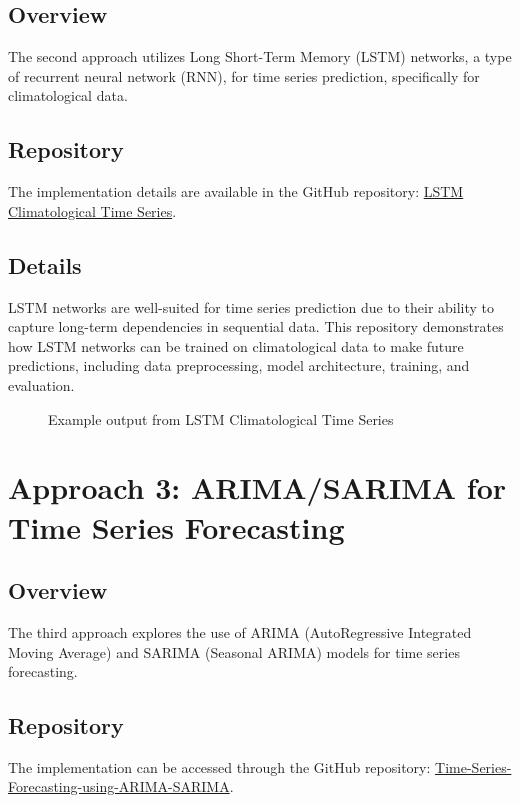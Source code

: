 \documentclass{article}
\begin{document}
\subsection{Overview}
The second approach utilizes Long Short-Term Memory (LSTM) networks, a type of recurrent neural network (RNN), for time series prediction, specifically for climatological data.

\subsection{Repository}
The implementation details are available in the GitHub repository: \href{https://github.com/danielefranceschi/lstm-climatological-time-series?tab=readme-ov-file}{LSTM Climatological Time Series}.

\subsection{Details}
LSTM networks are well-suited for time series prediction due to their ability to capture long-term dependencies in sequential data. This repository demonstrates how LSTM networks can be trained on climatological data to make future predictions, including data preprocessing, model architecture, training, and evaluation.

\begin{figure}[h]
\centering
\caption{Example output from LSTM Climatological Time Series}
\end{figure}

\section{Approach 3: ARIMA/SARIMA for Time Series Forecasting}
\subsection{Overview}
The third approach explores the use of ARIMA (AutoRegressive Integrated Moving Average) and SARIMA (Seasonal ARIMA) models for time series forecasting.

\subsection{Repository}
The implementation can be accessed through the GitHub repository: \href{https://github.com/javaidiqbal11/Time-Series-Forecasting-using-ARIMA-SARIMA}{Time-Series-Forecasting-using-ARIMA-SARIMA}.
\end{document}
